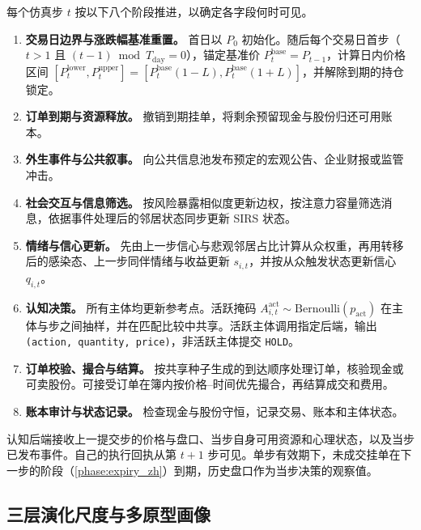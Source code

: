 每个仿真步 $t$ 按以下八个阶段推进，以确定各字段何时可见。
\begin{enumerate}[leftmargin=*, label=(\arabic*), ref=\arabic*]
  \item\label{phase:boundary_zh} \textbf{交易日边界与涨跌幅基准重置。} 首日以 $P_0$ 初始化。随后每个交易日首步（$t>1$ 且 $(t-1)\bmod T_{\mathrm{day}}=0$），锚定基准价 $P^{\mathrm{base}}_t = P_{t-1}$，计算日内价格区间 $[P_t^{\mathrm{lower}}, P_t^{\mathrm{upper}}] = [P^{\mathrm{base}}_t(1-L), P^{\mathrm{base}}_t(1+L)]$，并解除到期的持仓锁定。
  \item\label{phase:expiry_zh} \textbf{订单到期与资源释放。} 撤销到期挂单，将剩余预留现金与股份归还可用账本。
  \item\label{phase:events_zh} \textbf{外生事件与公共叙事。} 向公共信息池发布预定的宏观公告、企业财报或监管冲击。
  \item\label{phase:social_zh} \textbf{社会交互与信息筛选。} 按风险暴露相似度更新边权，按注意力容量筛选消息，依据事件处理后的邻居状态同步更新 SIRS 状态。
  \item\label{phase:behavior_zh} \textbf{情绪与信心更新。} 先由上一步信心与悲观邻居占比计算从众权重，再用转移后的感染态、上一步同伴情绪与收益更新 $s_{i,t}$，并按从众触发状态更新信心 $q_{i,t}$。
  \item\label{phase:decision_zh} \textbf{认知决策。} 所有主体均更新参考点。活跃掩码 $A^{\mathrm{act}}_{i,t}\sim\mathrm{Bernoulli}(p_{\mathrm{act}})$ 在主体与步之间抽样，并在匹配比较中共享。活跃主体调用指定后端，输出 \texttt{(action, quantity, price)}，非活跃主体提交 \texttt{HOLD}。
  \item\label{phase:execution_zh} \textbf{订单校验、撮合与结算。} 按共享种子生成的到达顺序处理订单，核验现金或可卖股份。可接受订单在簿内按价格--时间优先撮合，再结算成交和费用。
  \item\label{phase:commit_zh} \textbf{账本审计与状态记录。} 检查现金与股份守恒，记录交易、账本和主体状态。
\end{enumerate}

认知后端接收上一提交步的价格与盘口、当步自身可用资源和心理状态，以及当步已发布事件。自己的执行回执从第 $t+1$ 步可见。单步有效期下，未成交挂单在下一步的阶段（\ref{phase:expiry_zh}）到期，历史盘口作为当步决策的观察值。

\subsection{三层演化尺度与多原型画像}
\label{sec:method:population_zh}

